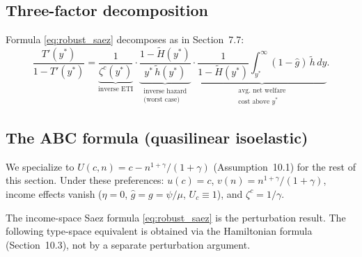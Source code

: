 \documentclass[12pt,a4paper]{article}
\theoremstyle{definition}
\theoremstyle{plain}
\theoremstyle{remark}
\begin{document}
\subsection{Three-factor decomposition}
\label{sec:three_factor}

Formula \eqref{eq:robust_saez} decomposes as in Section~7.7:
\[
  \frac{T'(y^*)}{1-T'(y^*)}
  = \underbrace{\frac{1}{\zeta^c(y^*)}}_{\text{inverse ETI}}
  \cdot
  \underbrace{\frac{1-\widetilde{H}(y^*)}{y^*\,
    \widetilde{h}(y^*)}}_{\substack{\text{inverse hazard}\\
    \text{(worst case)}}}
  \cdot
  \underbrace{\frac{1}{1-\widetilde{H}(y^*)}
    \int_{y^*}^\infty
    (1-\hat{g})\,\widetilde{h}\,dy}_{\substack{
    \text{avg.\ net welfare}\\
    \text{cost above }y^*}}.
\]





\subsection{The ABC formula (quasilinear isoelastic)}
\label{sec:quasilinear}
\label{sec:ABC}

We specialize to $U(c,n) = c - n^{1+\gamma}/(1+\gamma)$
(Assumption~10.1) for the rest of this section.
Under these preferences: $u(c) = c$,
$v(n) = n^{1+\gamma}/(1+\gamma)$, income effects vanish
($\eta = 0$, $\hat g = g = \psi/\mu$, $U_c \equiv 1$),
and $\zeta^c = 1/\gamma$.

The income-space Saez formula \eqref{eq:robust_saez} is the
perturbation result.  The following type-space equivalent is
obtained via the Hamiltonian formula (Section~10.3), not by
a separate perturbation argument.
\end{document}
